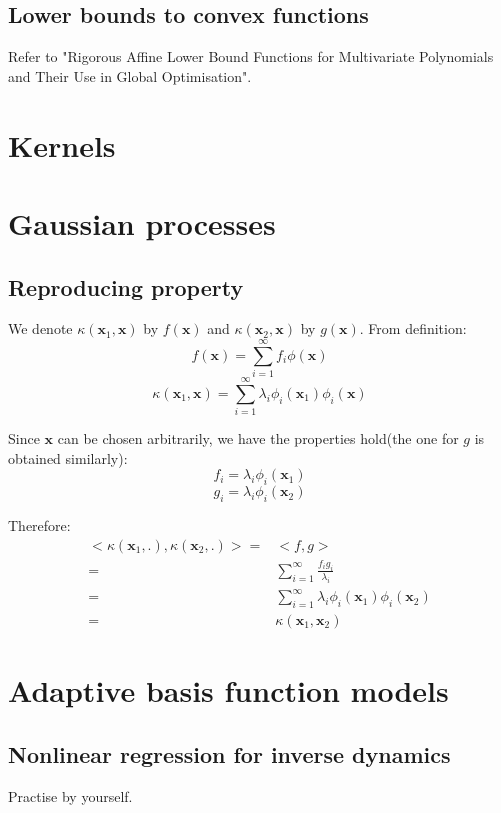 \documentclass[UTF8]{ctexart}
\begin{document}
\subsection{Lower bounds to convex functions}
Refer to "Rigorous Affine Lower Bound Functions for Multivariate Polynomials and Their Use in Global Optimisation".

\newpage
\section{Kernels}


\newpage
\section{Gaussian processes}
\subsection{Reproducing property}
We denote $\kappa(\textbf{x}_{1},\textbf{x})$ by $f(\textbf{x})$ and $\kappa(\textbf{x}_{2},\textbf{x})$ by $g(\textbf{x})$. From definition:
$$f(\textbf{x})=\sum_{i=1}^{\infty}f_{i}\phi(\textbf{x})$$
$$\kappa(\textbf{x}_{1},\textbf{x})=\sum_{i=1}^{\infty}\lambda_{i}\phi_{i}(\textbf{x}_{1})\phi_{i}(\textbf{x})$$

Since $\textbf{x}$ can be chosen arbitrarily, we have the properties hold(the one for $g$ is obtained similarly):
$$f_{i}=\lambda_{i}\phi_{i}(\textbf{x}_{1})$$
$$g_{i}=\lambda_{i}\phi_{i}(\textbf{x}_{2})$$

Therefore:
\begin{align}
<\kappa(\textbf{x}_{1},.), \kappa(\textbf{x}_{2},.)> = & <f,g> \nonumber \\
=&\sum_{i=1}^{\infty}\frac{f_{i}g_{i}}{\lambda_{i}} \nonumber \\
=&\sum_{i=1}^{\infty}\lambda_{i}\phi_{i}(\textbf{x}_{1})\phi_{i}(\textbf{x}_{2}) \nonumber \\
=&\kappa(\textbf{x}_{1},\textbf{x}_{2}) \nonumber
\end{align}

\newpage
\section{Adaptive basis function models}
\subsection{Nonlinear regression for inverse dynamics}
Practise by yourself.
\end{document}
